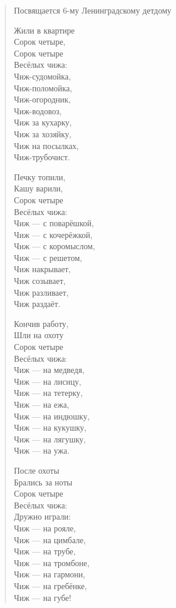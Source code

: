 \begin{verse}
\noindent Посвящается 6-му Ленинградскому детдому

Жили в квартире \\
Сорок четыре, \\
Сорок четыре \\
Весёлых чижа: \\
Чиж-судомойка, \\
Чиж-поломойка, \\
Чиж-огородник, \\
Чиж-водовоз, \\
Чиж за кухарку, \\
Чиж за хозяйку, \\
Чиж на посылках, \\
Чиж-трубочист.

Печку топили, \\
Кашу варили, \\
Сорок четыре \\
Весёлых чижа: \\
Чиж --- с поварёшкой, \\
Чиж --- с кочерёжкой, \\
Чиж --- с коромыслом, \\
Чиж --- с решетом, \\
Чиж накрывает, \\
Чиж созывает, \\
Чиж разливает, \\
Чиж раздаёт.

Кончив работу, \\
Шли на охоту \\
Сорок четыре \\
Весёлых чижа: \\
Чиж --- на медведя, \\
Чиж --- на лисицу, \\
Чиж --- на тетерку, \\
Чиж --- на ежа, \\
Чиж --- на индюшку, \\
Чиж --- на кукушку, \\
Чиж --- на лягушку, \\
Чиж --- на ужа.

После охоты \\
Брались за ноты \\
Сорок четыре \\
Весёлых чижа: \\
Дружно играли: \\
Чиж --- на рояле, \\
Чиж --- на цимбале, \\
Чиж --- на трубе, \\
Чиж --- на тромбоне, \\
Чиж --- на гармони, \\
Чиж --- на гребёнке, \\
Чиж --- на губе!


\end{verse}
